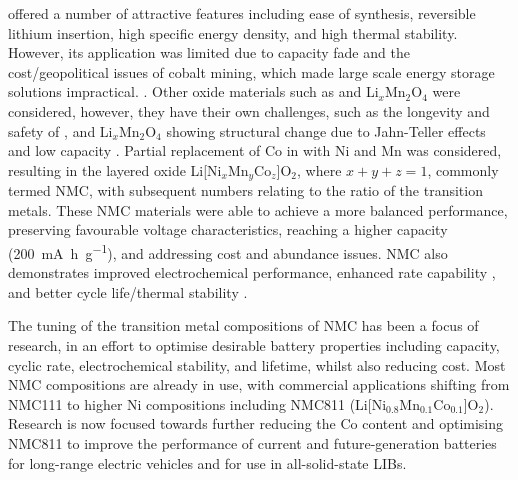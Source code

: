 \documentclass[journal=jacsat,manuscript=article]{achemso}
\begin{document}
 offered a number of attractive features including ease of synthesis, reversible lithium insertion, high specific energy density, and high thermal stability.\cite{gibbard1989high,plichta1989improved} However, its application was limited due to capacity fade and the cost/geopolitical issues of cobalt mining, which made large scale energy storage solutions impractical. \cite{mo_impact_2018,Banza2009}. Other oxide materials such as  and Li$_x$Mn$_2$O$_4$ were considered, however, they have their own challenges, such as the longevity and safety of , \cite{min_comparative_2016} and Li$_x$Mn$_2$O$_4$ showing structural change due to Jahn-Teller effects and low capacity \cite{tian_performance_2018}. Partial replacement of Co in  with Ni and Mn was considered, resulting in the layered oxide Li[Ni$_x$Mn$_y$Co$_z$]O$_2$, where $x+y+z=1$, commonly termed NMC, with subsequent numbers relating to the ratio of the transition metals.\cite{paulsen2000o2,paulsen20002, lu2001layered,rozier2015li} These NMC materials were able to achieve a more balanced performance, preserving favourable voltage characteristics, reaching a higher capacity (\SI{200}{mA.h.g^{-1}}), and addressing cost and abundance issues. \cite{sun_electronic_2017,larcher2015towards,ohzuku2001layered} NMC also demonstrates improved electrochemical performance, enhanced rate capability \cite{noh2013comparison,dahn1991rechargeable}, and better cycle life/thermal stability \cite{kim2006synthesis,armstrong1996synthesis}.

The tuning of the transition metal compositions of NMC has been a focus of research, in an effort to optimise desirable battery properties including capacity, cyclic rate, electrochemical stability, and lifetime, whilst also reducing cost. \cite{duan2019insights} Most NMC compositions are already in use, with commercial applications shifting from NMC111 to higher Ni compositions including NMC811 (Li[Ni$_{0.8}$Mn$_{0.1}$Co$_{0.1}$]O$_2$). \cite{zhang2018structural} Research is now focused towards further reducing the Co content and optimising NMC811 to improve the performance of current and future-generation batteries for long-range electric vehicles \cite{azevedo2018mining} and for use in all-solid-state LIBs. \cite{myung2017nickel,ohzuku_layered_2001, lu2001layered,belharouak2003li,kim2014unexpected,sun_electronic_2017}
\end{document}
